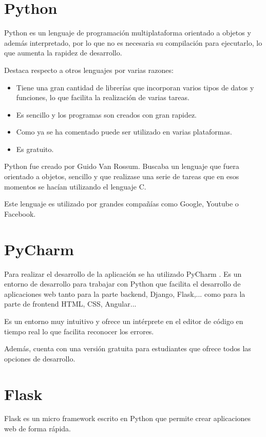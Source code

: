 
\section{Python}
Python \cite{python} es un lenguaje de programación multiplataforma orientado a objetos y además interpretado, por lo que no es necesaria su compilación para ejecutarlo, lo que aumenta la rapidez de desarrollo.

Destaca respecto a otros lenguajes por varias razones:
\begin{itemize}
\tightlist
    \item Tiene una gran cantidad de librerías que incorporan varios tipos de datos y funciones, lo que facilita la realización de varias tareas.
    \item Es sencillo y los programas son creados con gran rapidez. 
    \item Como ya se ha comentado puede ser utilizado en varias plataformas.
    \item Es gratuito.
\end{itemize}

Python fue creado por Guido Van Rossum. Buscaba un lenguaje que fuera orientado a objetos, sencillo y que realizase una serie de tareas que en esos momentos se hacían utilizando el lenguaje C.

Este lenguaje es utilizado por grandes compañías como Google, Youtube o Facebook.
\newpage
\section{PyCharm}
Para realizar el desarrollo de la aplicación se ha utilizado PyCharm \cite{pycharm}. Es un entorno de desarrollo para trabajar con Python que facilita el desarrollo de aplicaciones web tanto para la parte backend, Django, Flask,... como para la parte de frontend HTML, CSS, Angular...

Es un entorno muy intuitivo y ofrece un intérprete en el editor de código en tiempo real lo que facilita reconocer los errores. 

Además, cuenta con una versión gratuita para estudiantes que ofrece todos las opciones de desarrollo.



\section{Flask}
Flask \cite{flask} es un micro framework escrito en Python que permite crear aplicaciones web de forma rápida.

